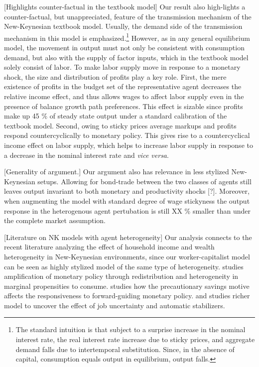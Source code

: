 [Highlights counter-factual in the textbook model] Our result also high-lights a counter-factual, but unappreciated, feature of the transmission mechanism of the New-Keynesian textbook model. Usually, the demand side of the transmission mechanism in this model is emphasized.\footnote{The standard intuition is that subject to a surprise increase in the nominal interest rate, the real interest rate increase due to sticky prices, and aggregate demand falls due to intertemporal substitution. Since, in the absence of capital, consumption equals output in equilibrium, output falls.} However, as in any general equilibrium model, the movement in output must not only be consistent with consumption demand, but also with the supply of factor inputs, which in the textbook model solely consist of labor. To make labor supply move in response to a monetary shock, the size and distribution of profits play a key role. First, the mere existence of profits in the budget set of the representative agent decreases the relative income effect, and thus allows wages to affect labor supply even in the presence of balance growth path preferences. This effect is sizable since profits make up 45 \% of steady state output under a standard calibration of the textbook model. Second, owing to sticky prices average markups and profits respond countercyclically to monetary policy. This gives rise to a countercyclical income effect on labor supply, which helps to increase labor supply in response to a decrease in the nominal interest rate and \emph{vice versa}.

[Generality of argument.] Our argument also has relevance in less stylized New-Keynesian setups. Allowing for bond-trade between the two classes of agents still leaves output invariant to both monetary and productivity shocks [?]. Moreover, when augmenting the model with standard degree of wage stickyness the output response in the heterogenous agent pertubation is still XX \% smaller than under the complete market assumption. 

[Literature on NK models with agent heterogeneity] Our analysis connects to the recent literature analyzing the effect of household income and wealth heterogeneity in New-Keynesian environments, since our worker-capitalist model can be seen as highly stylized model of the same type of heterogeneity. \citet{Auclert2015} studies amplification of monetary policy through redistribution and heterogeneity in marginal propensities to consume. \citet{McKay2015} studies how the precautionary savings motive affects the responsiveness to forward-guiding monetary policy. \citet{McKay2013} and \citet{Ravn2012a} studies richer model to uncover the effect of job uncertainty and automatic stabilizers. 

